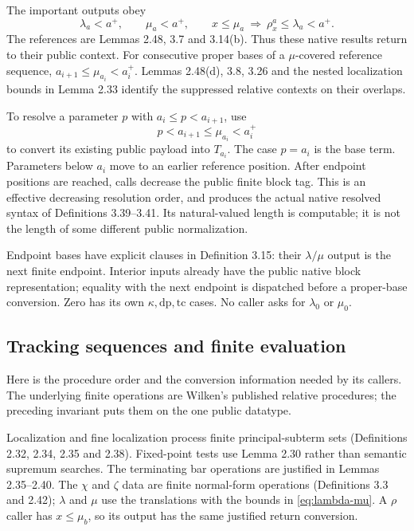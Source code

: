 \documentclass[11pt]{article}
\begin{document}
The important outputs obey
\begin{equation}\label{eq:lambda-mu}
 \lambda_a<a^+,
 \qquad \mu_a<a^+,
 \qquad x\le\mu_a\ \Longrightarrow\ \rho_x^a\le\lambda_a<a^+.
\end{equation}
The references are Lemmas 2.48, 3.7 and 3.14(b). Thus these native
results return to their public context. For consecutive proper
bases of a $\mu$-covered reference sequence,
$a_{i+1}\le\mu_{a_i}<a_i^+$. Lemmas 2.48(d), 3.8, 3.26 and the
nested localization bounds in Lemma 2.33 identify the suppressed
relative contexts on their overlaps.

To resolve a parameter $p$ with $a_i\le p<a_{i+1}$, use
\[
 p<a_{i+1}\le\mu_{a_i}<a_i^+
\]
to convert its existing public payload into $T_{a_i}$. The case
$p=a_i$ is the base term. Parameters below $a_i$ move to an earlier
reference position. After endpoint positions are reached, calls
decrease the public finite block tag. This is an effective decreasing
resolution order, and produces the actual native resolved syntax
of Definitions 3.39--3.41. Its natural-valued length is computable;
it is not the length of some different public normalization.

Endpoint bases have explicit clauses in Definition 3.15: their
$\lambda/\mu$ output is the next finite endpoint. Interior inputs
already have the public native block representation; equality with
the next endpoint is dispatched before a proper-base conversion.
Zero has its own $\kappa,\mathrm{dp},\mathrm{tc}$ cases. No caller
asks for $\lambda_0$ or $\mu_0$.

\subsection{Tracking sequences and finite evaluation}

Here is the procedure order and the conversion information needed by
its callers. The underlying finite operations are Wilken's published
relative procedures; the preceding invariant puts them on the one
public datatype.

Localization and fine localization process finite principal-subterm
sets (Definitions 2.32, 2.34, 2.35 and 2.38). Fixed-point tests use
Lemma 2.30 rather than semantic supremum searches. The terminating
bar operations are justified in Lemmas 2.35--2.40. The $\chi$ and
$\zeta$ data are finite normal-form operations (Definitions 3.3
and 2.42); $\lambda$ and $\mu$ use the translations with the
bounds in \eqref{eq:lambda-mu}. A $\rho$ caller has $x\le\mu_b$,
so its output has the same justified return conversion.
\end{document}
